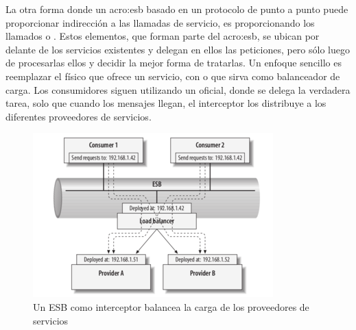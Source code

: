 La otra forma donde un \gls{acro:esb} basado en un protocolo de punto a punto puede proporcionar indirección a las llamadas de servicio, es proporcionando los llamados  o . Estos elementos, que forman parte del \gls{acro:esb}, se ubican por delante de los servicios existentes y delegan en ellos las peticiones, pero sólo luego de procesarlas ellos y decidir la mejor forma de tratarlas. Un enfoque sencillo es reemplazar el  físico que ofrece un servicio, con  o  que sirva como balanceador de carga. Los consumidores siguen utilizando un  oficial, donde se delega la verdadera tarea, solo que cuando los mensajes llegan, el interceptor los distribuye a los diferentes proveedores de servicios\cite[p.~52]{josuttis2007}.

\begin{figure}[H]
  \includegraphics[width=\linewidth]{src/images/03-capitulo-3/tecnologias/esb/esb-interceptors-load-balancer.png}
  \caption{Un ESB como interceptor balancea la carga de los proveedores de servicios}
  \label{fig:esb-interceptors-load-balancer}
\end{figure}
